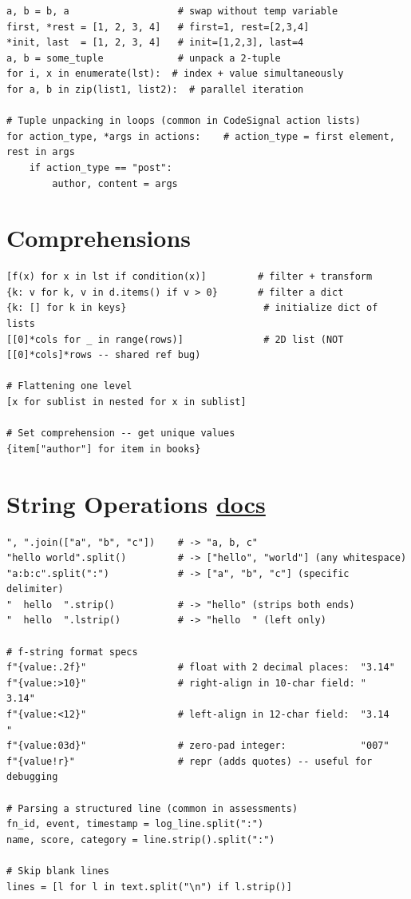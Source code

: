 \documentclass[10pt,letterpaper]{article}
\begin{document}
\begin{lstlisting}
a, b = b, a                   # swap without temp variable
first, *rest = [1, 2, 3, 4]   # first=1, rest=[2,3,4]
*init, last  = [1, 2, 3, 4]   # init=[1,2,3], last=4
a, b = some_tuple             # unpack a 2-tuple
for i, x in enumerate(lst):  # index + value simultaneously
for a, b in zip(list1, list2):  # parallel iteration

# Tuple unpacking in loops (common in CodeSignal action lists)
for action_type, *args in actions:    # action_type = first element, rest in args
    if action_type == "post":
        author, content = args
\end{lstlisting}

\section{Comprehensions}

\begin{lstlisting}
[f(x) for x in lst if condition(x)]         # filter + transform
{k: v for k, v in d.items() if v > 0}       # filter a dict
{k: [] for k in keys}                        # initialize dict of lists
[[0]*cols for _ in range(rows)]              # 2D list (NOT [[0]*cols]*rows -- shared ref bug)

# Flattening one level
[x for sublist in nested for x in sublist]

# Set comprehension -- get unique values
{item["author"] for item in books}
\end{lstlisting}

\section{String Operations \normalfont\small\href{https://docs.python.org/3/library/stdtypes.html#text-sequence-type-str}{docs}}

\begin{lstlisting}
", ".join(["a", "b", "c"])    # -> "a, b, c"
"hello world".split()         # -> ["hello", "world"] (any whitespace)
"a:b:c".split(":")            # -> ["a", "b", "c"] (specific delimiter)
"  hello  ".strip()           # -> "hello" (strips both ends)
"  hello  ".lstrip()          # -> "hello  " (left only)

# f-string format specs
f"{value:.2f}"                # float with 2 decimal places:  "3.14"
f"{value:>10}"                # right-align in 10-char field: "      3.14"
f"{value:<12}"                # left-align in 12-char field:  "3.14        "
f"{value:03d}"                # zero-pad integer:             "007"
f"{value!r}"                  # repr (adds quotes) -- useful for debugging

# Parsing a structured line (common in assessments)
fn_id, event, timestamp = log_line.split(":")
name, score, category = line.strip().split(":")

# Skip blank lines
lines = [l for l in text.split("\n") if l.strip()]
\end{lstlisting}
\end{document}
